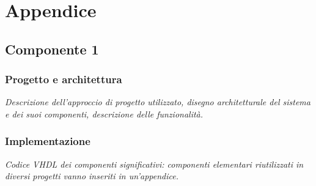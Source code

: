 \documentclass[../main.tex]{subfiles}
\begin{document}
\chapter{Appendice}

\section*{Componente 1}

\subsection*{Progetto e architettura}
\textit{Descrizione dell’approccio di progetto utilizzato, disegno architetturale del sistema e dei suoi componenti, descrizione delle funzionalità.}

\subsection*{Implementazione}
\textit{Codice VHDL dei componenti significativi: componenti elementari riutilizzati in diversi progetti vanno inseriti in un’appendice.}
\end{document}
